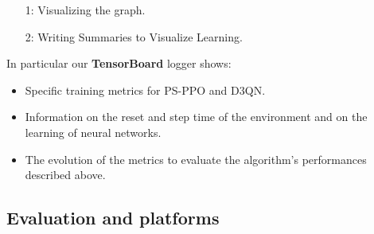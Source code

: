 \documentclass[11pt, a4paper, hidelinks]{report}
\begin{document}
\begin{enumerate}
\item [1:]Visualizing the graph.
\item [2:]Writing Summaries to Visualize Learning.
\end{enumerate}

In particular our \textbf{TensorBoard} logger shows:

\begin{itemize}
	\item Specific training metrics for PS-PPO and D3QN\@.
	\item Information on the reset and step time of the environment and on the learning of neural networks.
	\item The evolution of the metrics to evaluate the algorithm's performances described above.
\end{itemize}

\subsection{Evaluation and platforms}\label{subsec:evaluation-and-platforms}
\end{document}
